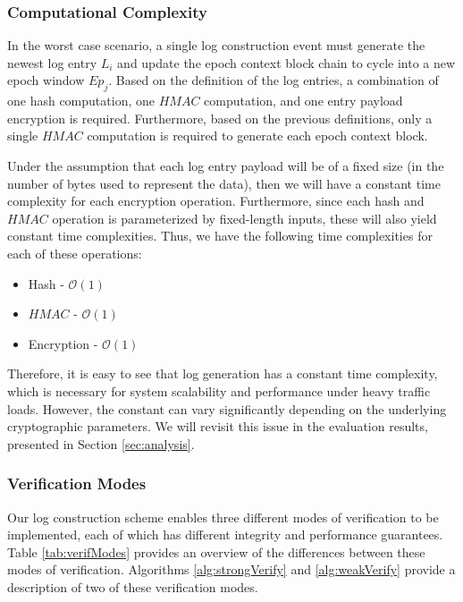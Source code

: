 \documentclass{sig-alternate}
\begin{document}
\subsubsection{Computational Complexity}
\label{log:ComputationalComplexity}
In the worst case scenario, a single log construction event must generate the newest log entry $L_i$ and 
update the epoch context block chain to cycle into a new epoch window $Ep_j$. Based on the definition
of the log entries, a combination of one hash computation, one $HMAC$ computation, and one entry payload
encryption is required. Furthermore, based on the previous definitions, only a single
$HMAC$ computation is required to generate each epoch context block. 

Under the assumption that each log entry payload will be of a fixed size (in the number of bytes 
used to represent the data), then we will have a constant time complexity for each encryption 
operation. Furthermore, since each hash and $HMAC$ operation is parameterized by fixed-length
inputs, these will also yield constant time complexities. Thus, we have the following time complexities
for each of these operations:
\begin{itemize}
	\item Hash - $\mathcal{O}(1)$
	\item $HMAC$ - $\mathcal{O}(1)$
	\item Encryption - $\mathcal{O}(1)$
\end{itemize}
Therefore, it is easy to see that log generation has a constant time complexity, which is necessary for system scalability
and performance under heavy traffic loads. However, the constant can vary significantly depending on
the underlying cryptographic parameters. We will revisit this issue in the evaluation results, presented in Section \ref{sec:analysis}.


\subsubsection{Verification Modes}
\label{log:VerificationModes}

Our log construction scheme enables three different modes of verification to be implemented,
each of which has different integrity and performance guarantees. Table \ref{tab:verifModes} 
provides an overview of the differences between these modes of verification. Algorithms \ref{alg:strongVerify}
and \ref{alg:weakVerify} provide a description of two of these verification modes.
\end{document}
